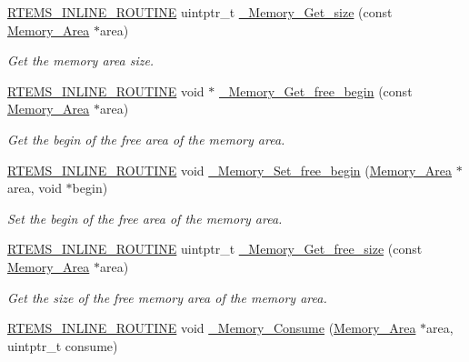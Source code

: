 \begin{DoxyCompactItemize}
\mbox{\hyperlink{group__RTEMSScoreBaseDefs_gac216239df231d5dbd15e3520b0b9313f}{R\+T\+E\+M\+S\+\_\+\+I\+N\+L\+I\+N\+E\+\_\+\+R\+O\+U\+T\+I\+NE}} uintptr\+\_\+t \mbox{\hyperlink{group__RTEMSScoreMemory_ga8c9568988e1a8d39af22e1bc76a55cf1}{\+\_\+\+Memory\+\_\+\+Get\+\_\+size}} (const \mbox{\hyperlink{structMemory__Area}{Memory\+\_\+\+Area}} $\ast$area)
\begin{DoxyCompactList}\small\item\em Get the memory area size. \end{DoxyCompactList}\item 
\mbox{\hyperlink{group__RTEMSScoreBaseDefs_gac216239df231d5dbd15e3520b0b9313f}{R\+T\+E\+M\+S\+\_\+\+I\+N\+L\+I\+N\+E\+\_\+\+R\+O\+U\+T\+I\+NE}} void $\ast$ \mbox{\hyperlink{group__RTEMSScoreMemory_ga75120e2d8e6de6e70c9e910d933828e5}{\+\_\+\+Memory\+\_\+\+Get\+\_\+free\+\_\+begin}} (const \mbox{\hyperlink{structMemory__Area}{Memory\+\_\+\+Area}} $\ast$area)
\begin{DoxyCompactList}\small\item\em Get the begin of the free area of the memory area. \end{DoxyCompactList}\item 
\mbox{\hyperlink{group__RTEMSScoreBaseDefs_gac216239df231d5dbd15e3520b0b9313f}{R\+T\+E\+M\+S\+\_\+\+I\+N\+L\+I\+N\+E\+\_\+\+R\+O\+U\+T\+I\+NE}} void \mbox{\hyperlink{group__RTEMSScoreMemory_gad4aab7f862ed22005baa5d6524f2471d}{\+\_\+\+Memory\+\_\+\+Set\+\_\+free\+\_\+begin}} (\mbox{\hyperlink{structMemory__Area}{Memory\+\_\+\+Area}} $\ast$area, void $\ast$begin)
\begin{DoxyCompactList}\small\item\em Set the begin of the free area of the memory area. \end{DoxyCompactList}\item 
\mbox{\hyperlink{group__RTEMSScoreBaseDefs_gac216239df231d5dbd15e3520b0b9313f}{R\+T\+E\+M\+S\+\_\+\+I\+N\+L\+I\+N\+E\+\_\+\+R\+O\+U\+T\+I\+NE}} uintptr\+\_\+t \mbox{\hyperlink{group__RTEMSScoreMemory_ga587b6b432ef9f07573042c0dc76cfe48}{\+\_\+\+Memory\+\_\+\+Get\+\_\+free\+\_\+size}} (const \mbox{\hyperlink{structMemory__Area}{Memory\+\_\+\+Area}} $\ast$area)
\begin{DoxyCompactList}\small\item\em Get the size of the free memory area of the memory area. \end{DoxyCompactList}\item 
\mbox{\hyperlink{group__RTEMSScoreBaseDefs_gac216239df231d5dbd15e3520b0b9313f}{R\+T\+E\+M\+S\+\_\+\+I\+N\+L\+I\+N\+E\+\_\+\+R\+O\+U\+T\+I\+NE}} void \mbox{\hyperlink{group__RTEMSScoreMemory_ga59b8e7636ced3a31e9dfda4519753592}{\+\_\+\+Memory\+\_\+\+Consume}} (\mbox{\hyperlink{structMemory__Area}{Memory\+\_\+\+Area}} $\ast$area, uintptr\+\_\+t consume)

\end{DoxyCompactItemize}
